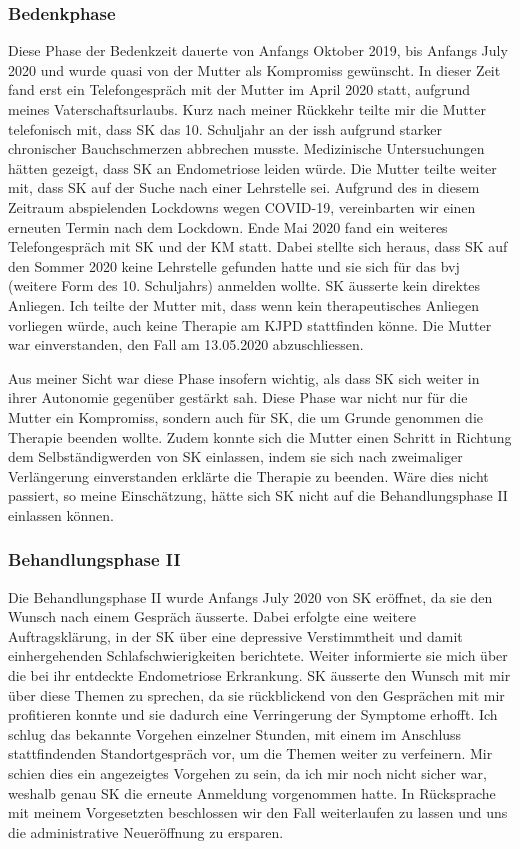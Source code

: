 \subsubsection{Bedenkphase}
Diese Phase der Bedenkzeit dauerte von Anfangs Oktober 2019, bis Anfangs July 2020 und wurde quasi von der Mutter als Kompromiss gewünscht. In dieser Zeit fand erst ein Telefongespräch mit der Mutter im April 2020 statt, aufgrund meines Vaterschaftsurlaubs. Kurz nach meiner Rückkehr teilte mir die Mutter telefonisch mit, dass SK das 10. Schuljahr an der \ac{issh} aufgrund starker chronischer Bauchschmerzen abbrechen musste. Medizinische Untersuchungen hätten gezeigt, dass SK an Endometriose leiden würde. Die Mutter teilte weiter mit, dass SK auf der Suche nach einer Lehrstelle sei. Aufgrund des in diesem Zeitraum abspielenden Lockdowns wegen COVID-19, vereinbarten wir einen erneuten Termin nach dem Lockdown. Ende Mai 2020 fand ein weiteres Telefongespräch mit SK und der KM statt. Dabei stellte sich heraus, dass SK auf den Sommer 2020 keine Lehrstelle gefunden hatte und sie sich für das \ac{bvj} (weitere Form des 10. Schuljahrs) anmelden wollte. SK äusserte kein direktes Anliegen. Ich teilte der Mutter mit, dass wenn kein therapeutisches Anliegen vorliegen würde, auch keine Therapie am KJPD stattfinden könne. Die Mutter war einverstanden, den Fall am 13.05.2020 abzuschliessen.

Aus meiner Sicht war diese Phase insofern wichtig, als dass SK sich weiter in ihrer Autonomie gegenüber gestärkt sah. Diese Phase war nicht nur für die Mutter ein Kompromiss, sondern auch für SK, die um Grunde genommen die Therapie beenden wollte. Zudem konnte sich die Mutter einen Schritt in Richtung dem Selbständigwerden von SK einlassen, indem sie sich nach zweimaliger Verlängerung einverstanden erklärte die Therapie zu beenden. Wäre dies nicht passiert, so meine Einschätzung, hätte sich SK nicht auf die Behandlungsphase II einlassen können. 

\subsubsection{Behandlungsphase II}
Die Behandlungsphase II wurde Anfangs July 2020 von SK eröffnet, da sie den Wunsch nach einem Gespräch äusserte. Dabei erfolgte eine weitere Auftragsklärung, in der SK über eine depressive Verstimmtheit und damit einhergehenden Schlafschwierigkeiten berichtete. Weiter informierte sie mich über die bei ihr entdeckte Endometriose Erkrankung. SK äusserte den Wunsch mit mir über diese Themen zu sprechen, da sie rückblickend von den Gesprächen mit mir profitieren konnte und sie dadurch eine Verringerung der Symptome erhofft. Ich schlug das bekannte Vorgehen einzelner Stunden, mit einem im Anschluss stattfindenden Standortgespräch vor, um die Themen weiter zu verfeinern. Mir schien dies ein angezeigtes Vorgehen zu sein, da ich mir noch nicht sicher war, weshalb genau SK die erneute Anmeldung vorgenommen hatte. In Rücksprache mit meinem Vorgesetzten beschlossen wir den Fall weiterlaufen zu lassen und uns die administrative Neueröffnung zu ersparen.

